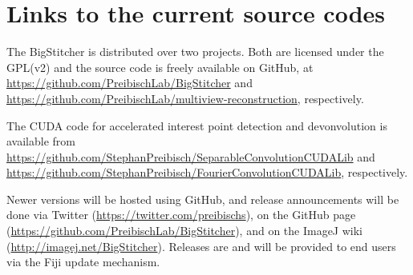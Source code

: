 
\section{Links to the current source codes}
\label{sec:currentcode}

The BigStitcher is distributed over two projects. Both are licensed under the GPL(v2) and the source code is freely available on GitHub, at \url{https://github.com/PreibischLab/BigStitcher} and \url{https://github.com/PreibischLab/multiview-reconstruction}, respectively.

The CUDA code for accelerated interest point detection and devonvolution is available from \url{https://github.com/StephanPreibisch/SeparableConvolutionCUDALib} and \url{https://github.com/StephanPreibisch/FourierConvolutionCUDALib}, respectively.

Newer versions will be hosted using GitHub, and release announcements will be done via Twitter (\url{https://twitter.com/preibischs}), on the GitHub page (\url{https://github.com/PreibischLab/BigStitcher}), and on the ImageJ wiki (\url{http://imagej.net/BigStitcher}). Releases are and will be provided to end users via the Fiji update mechanism.
